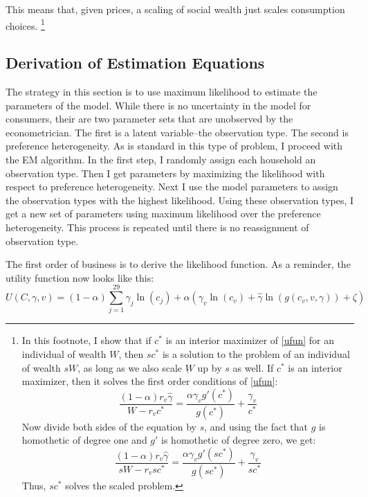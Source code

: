 \documentclass{article}
\begin{document}
This means that, given prices, a scaling of social wealth just scales consumption choices.
\footnote{
In this footnote, I show that if $c^*$ is an interior maximizer of \eqref{ufun} for an individual of wealth $W$, then $s c^*$ is a solution to the  problem of an individual of wealth $s W$, as long as we also scale $\underbar{W}$ up by $s$ as well.
If $c^*$ is an interior maximizer, then it solves the first order conditions of \eqref{ufun}:
\[
\frac{(1-\alpha)r_v \hat{\gamma}}{W-r_v c^*} = \frac{\alpha \gamma_v g'(c^*)}{g(c^*)} + \frac{\gamma_v}{c^*}
\]
Now divide both sides of the equation by $s$, and using the fact that $g$ is homothetic of degree one and $g'$ is homothetic of degree zero, we get:
\[
\frac{(1-\alpha)r_v \hat{\gamma}}{s W-r_v s c^*} = \frac{\alpha \gamma_v g'(s c^*)}{g(s c^*)} + \frac{\gamma_v}{s c^*}
\]
Thus, $s c^*$ solves the scaled problem.
}
\subsection{Derivation of Estimation Equations}
The strategy in this section is to use maximum likelihood to estimate the parameters of the model.  
While there is no uncertainty in the model for consumers, their are two parameter sets that are unobserved by the econometrician.
The first is a latent variable--the observation type.
The second is preference heterogeneity.
As is standard in this type of problem, I proceed with the EM algorithm.
In the first step, I randomly assign each household an observation type.
Then I get parameters by maximizing the likelihood with respect to preference heterogeneity.
Next I use the model parameters to assign the observation types with the highest likelihood.
Using these observation types, I get a new set of parameters using maximum likelihood over the preference heterogeneity.
This process is repeated until there is no reassignment of observation type.

The first order of business is to derive the likelihood function.
As a reminder, the utility function now looks like this:
\begin{equation}
	\label{totuti}
U(C,\gamma,v) = (1-\alpha) \sum_{j=1}^{29}\gamma_j \ln(c_j )  + \alpha \left(\gamma_v \ln(c_v)+ \hat{\gamma}\ln(g(c_v,v,\gamma))  + \zeta \right)
\end{equation}
\end{document}
